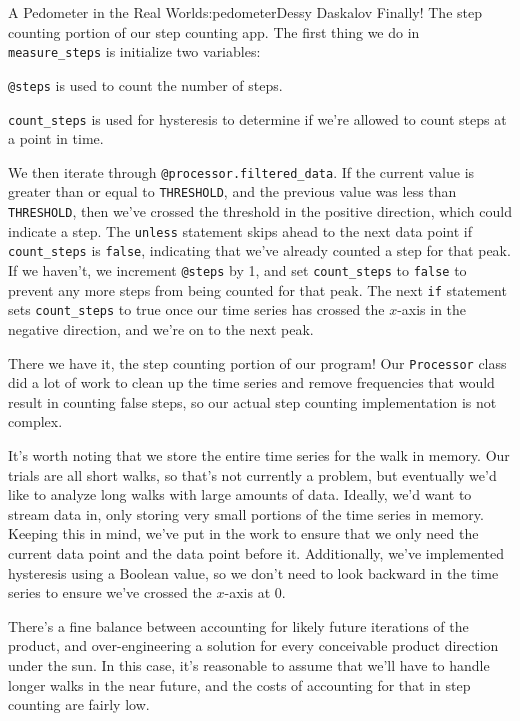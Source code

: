 \begin{aosachapter}{A Pedometer in the Real World}{s:pedometer}{Dessy Daskalov}
Finally! The step counting portion of our step counting app. The first
thing we do in \texttt{measure\_steps} is initialize two variables:

\begin{aosaitemize}

\item
  \texttt{@steps} is used to count the number of steps.
\item
  \texttt{count\_steps} is used for hysteresis to determine if we're
  allowed to count steps at a point in time.
\end{aosaitemize}

We then iterate through \texttt{@processor.filtered\_data}. If the
current value is greater than or equal to \texttt{THRESHOLD}, and the
previous value was less than \texttt{THRESHOLD}, then we've crossed the
threshold in the positive direction, which could indicate a step. The
\texttt{unless} statement skips ahead to the next data point if
\texttt{count\_steps} is \texttt{false}, indicating that we've already
counted a step for that peak. If we haven't, we increment
\texttt{@steps} by 1, and set \texttt{count\_steps} to \texttt{false} to
prevent any more steps from being counted for that peak. The next
\texttt{if} statement sets \texttt{count\_steps} to true once our time
series has crossed the $x$-axis in the negative direction, and we're on
to the next peak.

There we have it, the step counting portion of our program! Our
\texttt{Processor} class did a lot of work to clean up the time series
and remove frequencies that would result in counting false steps, so our
actual step counting implementation is not complex.

It's worth noting that we store the entire time series for the walk in
memory. Our trials are all short walks, so that's not currently a
problem, but eventually we'd like to analyze long walks with large
amounts of data. Ideally, we'd want to stream data in, only storing very
small portions of the time series in memory. Keeping this in mind, we've
put in the work to ensure that we only need the current data point and
the data point before it. Additionally, we've implemented hysteresis
using a Boolean value, so we don't need to look backward in the time
series to ensure we've crossed the $x$-axis at 0.

There's a fine balance between accounting for likely future iterations
of the product, and over-engineering a solution for every conceivable
product direction under the sun. In this case, it's reasonable to assume
that we'll have to handle longer walks in the near future, and the costs
of accounting for that in step counting are fairly low.


\end{aosachapter}
